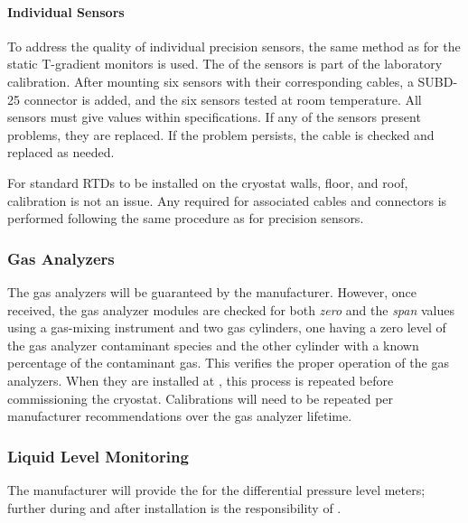\paragraph{Individual Sensors}
\label{sec:fdgen-slow-cryo-qc-is}

To address the quality of individual precision sensors, the same method as for the static T-gradient monitors %
is used.
The  of the sensors is part of the laboratory calibration. After mounting six sensors with their corresponding cables, a
SUBD-25 connector %
is added, and the six sensors tested at room temperature. All sensors %
must %
give values within specifications.  
If any of the sensors present problems, they are replaced.  If the problem persists, the cable is checked and replaced as needed.

For standard RTDs to be installed on the cryostat walls, floor, and roof, calibration is not an issue. Any  required for associated cables and connectors %
is performed following the same procedure as for precision sensors. 

\subsubsection{Gas Analyzers}
\label{sec:fdgen-slow-cryo-qc-ga}


The gas analyzers will be guaranteed by the manufacturer. However, once received, the gas analyzer modules %
are checked for both \textit{zero} and the \textit{span} values using a gas-mixing instrument and two gas cylinders, one having a zero level of the gas analyzer contaminant species and the other cylinder with a known percentage of the contaminant gas. This %
 verifies the proper operation of the gas analyzers. When they are installed at \surf, this process %
 is repeated before commissioning the cryostat. Calibrations will need to be repeated %
 per manufacturer recommendations over the gas analyzer lifetime.


\subsubsection{Liquid Level Monitoring}
\label{sec:fdgen-slow-cryo-qc-llm}

The manufacturer will provide the  for the differential pressure level meters; further  during and after installation %
is the responsibility of .

